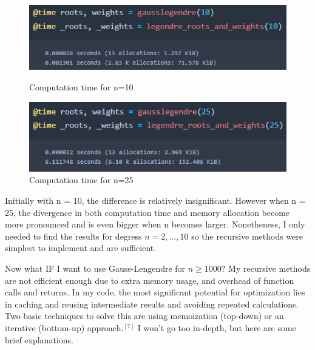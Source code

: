 \documentclass[twoside]{article}
\begin{document}
\begin{figure}[ht]
   \centering
   \begin{minipage}{0.45\textwidth}
        \centering
        \includegraphics[scale=0.65]{img/timer.png}
       \caption{Computation time for n=10}
    \end{minipage}\hfill
    \begin{minipage}{0.55\textwidth}
        \centering
        \includegraphics[scale=0.65]{img/time-n=25.png}
        \caption{Computation time for n=25}
    \end{minipage}
\end{figure}

Initially with n = 10, the difference is relatively insignificant. However when n = 25, the divergence in both computation time and memory allocation become more pronounced and is even bigger when n becomes larger. 
Nonetheness, I only needed to find the results for degress \(n= 2, ... , 10\) so the recursive methods were simplest to implement and are sufficient.

Now what IF I want to use Gauss-Lengendre for \(n \ge 1000\)? My recursive methods are not efficient enough due to extra memory usage, and overhead of function calls and returns. %
In my code, the most significant potential for optimization lies in caching and reusing intermediate results and avoiding repeated calculations. Two basic techniques to solve this are using memoization (top-down) or an iterative (bottom-up) approach.\(^{[7]}\) I won't go too in-depth, but here are some brief explanations. %
\end{document}
